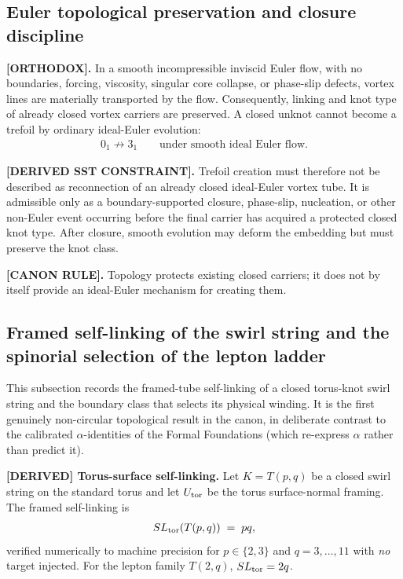 \documentclass[11pt]{article}
\theoremstyle{definition}
\theoremstyle{plain}
\theoremstyle{remark}
\begin{document}
    \subsection{Euler topological preservation and closure discipline}
        \label{subsec:euler_topological_preservation_closure}

        \textbf{[ORTHODOX].}
        In a smooth incompressible inviscid Euler flow, with no boundaries, forcing,
        viscosity, singular core collapse, or phase-slip defects, vortex lines are
        materially transported by the flow. Consequently, linking and knot type of
        already closed vortex carriers are preserved. A closed unknot cannot become
        a trefoil by ordinary ideal-Euler evolution:
        \begin{align}
            0_1 \not\longrightarrow 3_1
            \qquad
            \text{under smooth ideal Euler flow.}
            \label{eq:euler_no_unknot_to_trefoil}
        \end{align}

        \textbf{[DERIVED SST CONSTRAINT].}
        Trefoil creation must therefore not be described as reconnection of an
        already closed ideal-Euler vortex tube. It is admissible only as a
        boundary-supported closure, phase-slip, nucleation, or other non-Euler
        event occurring before the final carrier has acquired a protected closed
        knot type. After closure, smooth evolution may deform the embedding but
        must preserve the knot class.

        \textbf{[CANON RULE].}
        Topology protects existing closed carriers; it does not by itself provide
        an ideal-Euler mechanism for creating them.

    \subsection{Framed self-linking of the swirl string and the spinorial selection of the lepton ladder}
        \label{subsec:framed_selflinking_spinorial}

        This subsection records the framed-tube self-linking of a closed torus-knot swirl
        string and the boundary class that selects its physical winding. It is the first
        genuinely non-circular topological result in the canon, in deliberate contrast to the
        calibrated $\alpha$-identities of the Formal Foundations (which re-express $\alpha$
        rather than predict it).

        \textbf{[DERIVED] Torus-surface self-linking.}
        Let $K=T(p,q)$ be a closed swirl string on the standard torus and let $U_{\rm tor}$ be
        the torus surface-normal framing. The framed self-linking is
        \begin{align}
            SL_{\rm tor}(T(p,q)) \;=\; pq,
            \label{eq:SL_torus_pq}
        \end{align}
        verified numerically to machine precision for $p\in\{2,3\}$ and $q=3,\dots,11$ with
        \emph{no} target injected. For the lepton family $T(2,q)$, $SL_{\rm tor}=2q$.
\end{document}

